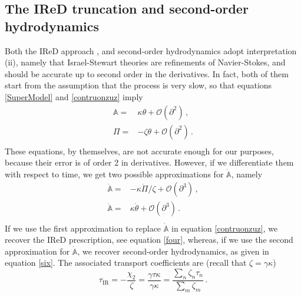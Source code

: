 \documentclass[a4paper, amsfonts, amssymb, amsmath, reprint, showkeys, nofootinbib, twoside, onecolumn,notitlepage]{revtex4-2}
\begin{document}
\subsection{The IReD truncation and second-order hydrodynamics}\label{IRUZZ}

Both the IReD approach \cite{WagnerIReD2022}, and second-order hydrodynamics \cite{Baier2008} adopt interpretation (ii), namely that Israel-Stewart theories are refinements of Navier-Stokes, and should be accurate up to second order in the derivatives. In fact, both of them start from the assumption that the process is very slow, so that equations \eqref{SuperModel} and \eqref{contruonzuz} imply
\begin{equation}
    \begin{split}
\mathbb{A} ={}& \kappa \theta +\mathcal{O}(\partial^2) \, , \\
\Pi ={}& -\zeta \theta +\mathcal{O}(\partial^2) \, . \\
    \end{split}
\end{equation}
These equations, by themselves, are not accurate enough for our purposes, because their error is of order 2 in derivatives. However, if we differentiate them with respect to time, we get two possible approximations for $\dot{\mathbb{A}}$, namely
\begin{equation}
    \begin{split}
\dot{\mathbb{A}}={}& -\kappa \dot{\Pi}/\zeta +\mathcal{O}(\partial^3) \, , \\
\dot{\mathbb{A}}={}& \kappa \dot{\theta} +\mathcal{O}(\partial^3) \, . \\
    \end{split}
\end{equation}
If we use the first approximation to replace $\dot{\mathbb{A}}$ in equation \eqref{contruonzuz}, we recover the IReD prescription, see equation \eqref{four}, whereas, if we use the second approximation for $\dot{\mathbb{A}}$, we recover second-order hydrodynamics, as given in equation \eqref{six}. The associated transport coefficients are (recall that $\zeta=\gamma \kappa$) 
\begin{equation}
    \tau_{\mathrm{IR}} = -\dfrac{\chi_2}{\zeta} = \dfrac{\gamma \tau \kappa}{\gamma \kappa} = \dfrac{\sum_n \zeta_n \tau_n}{\sum_m \zeta_m} \, .
\end{equation}
\end{document}
